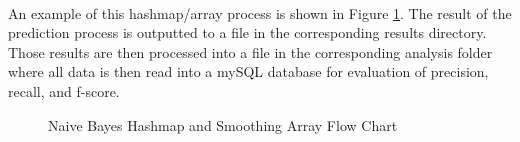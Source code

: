	\paragraph*{}An example of this hashmap/array process is shown in Figure \ref{fig:predictionFlowChart}. The result of the prediction process is outputted to a file in the corresponding results directory.  Those results are then processed into a file in the corresponding analysis folder where all data is then read into a mySQL database for evaluation of precision, recall, and f-score.
		\begin{figure}[ht!]
			\begin{center}
				\caption{Naive Bayes Hashmap and Smoothing Array Flow Chart}
				\label{fig:predictionFlowChart}
			\end{center}
		\end{figure}


